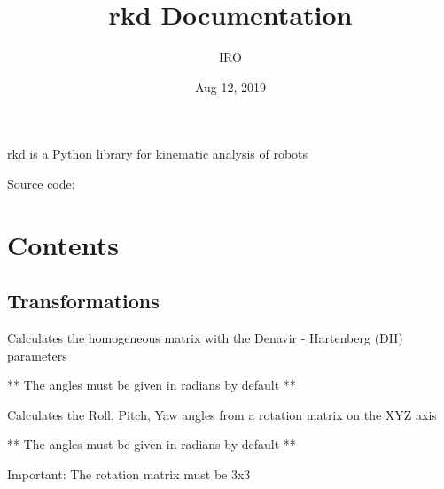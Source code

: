\documentclass[letterpaper,10pt,english]{sphinxmanual}
\title{rkd Documentation}
\date{Aug 12, 2019}
\author{IRO}
\begin{document}
\maketitle
\sphinxtableofcontents
{}\label{\detokenize{index::doc}}


rkd is a Python library for kinematic analysis of robots

Source code: 


\chapter{Contents}
\label{\detokenize{index:contents}}\label{\detokenize{index:welcome-to-rkd-s-documentation}}

\section{Transformations}
\label{\detokenize{_src/transformations::doc}}\label{\detokenize{_src/transformations:module-rkd.transformations}}\label{\detokenize{_src/transformations:transformations}}

\begin{fulllineitems}
\label{\detokenize{_src/transformations:rkd.transformations.htmDH}}
Calculates the homogeneous matrix with the Denavir - Hartenberg (DH) parameters

** The angles must be given in radians by default **

\end{fulllineitems}


\begin{fulllineitems}
\label{\detokenize{_src/transformations:rkd.transformations.rot2RPY}}
Calculates the Roll, Pitch, Yaw angles from a rotation matrix on the XYZ axis

** The angles must be given in radians by default **

Important: The rotation matrix must be 3x3

\end{fulllineitems}
\end{document}
